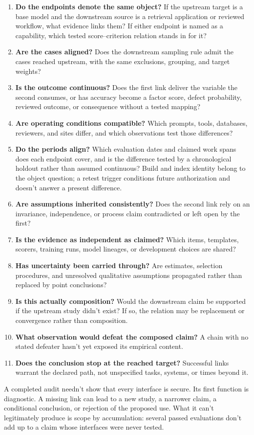 \documentclass[12pt]{article}
\begin{document}
\begin{enumerate}
\item \textbf{Do the endpoints denote the same object?} If the upstream target is a base model and the downstream source is a retrieval application or reviewed workflow, what evidence links them? If either endpoint is named as a capability, which tested score--criterion relation stands in for it?
\item \textbf{Are the cases aligned?} Does the downstream sampling rule admit the cases reached upstream, with the same exclusions, grouping, and target weights?
\item \textbf{Is the outcome continuous?} Does the first link deliver the variable the second consumes, or has accuracy become a factor score, defect probability, reviewed outcome, or consequence without a tested mapping?
\item \textbf{Are operating conditions compatible?} Which prompts, tools, databases, reviewers, and sites differ, and which observations test those differences?

\item \textbf{Do the periods align?} Which evaluation dates and claimed work spans does each endpoint cover, and is the difference tested by a chronological holdout rather than assumed continuous? Build and index identity belong to the object question; a retest trigger conditions future authorization and doesn't answer a present difference.
\item \textbf{Are assumptions inherited consistently?} Does the second link rely on an invariance, independence, or process claim contradicted or left open by the first?
\item \textbf{Is the evidence as independent as claimed?} Which items, templates, scorers, training runs, model lineages, or development choices are shared?
\item \textbf{Has uncertainty been carried through?} Are estimates, selection procedures, and unresolved qualitative assumptions propagated rather than replaced by point conclusions?
\item \textbf{Is this actually composition?} Would the downstream claim be supported if the upstream study didn't exist? If so, the relation may be replacement or convergence rather than composition.
\item \textbf{What observation would defeat the composed claim?} A chain with no stated defeater hasn't yet exposed its empirical content.
\item \textbf{Does the conclusion stop at the reached target?} Successful links warrant the declared path, not unspecified tasks, systems, or times beyond it.
\end{enumerate}

A completed audit needn't show that every interface is secure. Its first function is diagnostic. A missing link can lead to a new study, a narrower claim, a conditional conclusion, or rejection of the proposed use. What it can't legitimately produce is scope by accumulation: several passed evaluations don't add up to a claim whose interfaces were never tested.

\clearpage
\printbibliography
\end{document}

